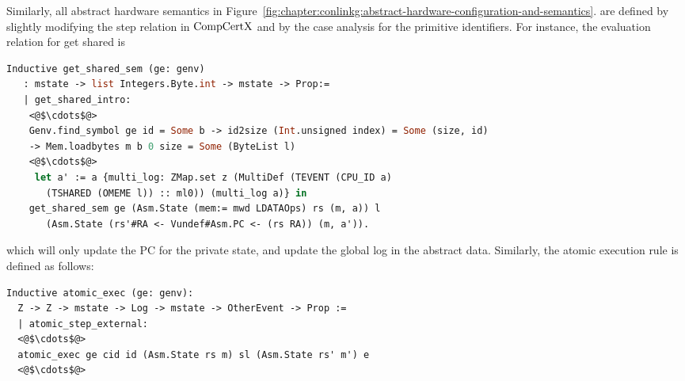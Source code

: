 Similarly, all abstract hardware semantics in  Figure~\ref{fig:chapter:conlinkg:abstract-hardware-configuration-and-semantics}.
are defined 
by slightly modifying the step relation in $\mathrm{CompCertX}$ 
and by the case analysis for the primitive identifiers. 
For instance, the evaluation relation for get shared is
\begin{lstlisting}[language=Caml]
 Inductive get_shared_sem (ge: genv) 
   : mstate -> list Integers.Byte.int -> mstate -> Prop:=
   | get_shared_intro: 
    <@$\cdots$@>
    Genv.find_symbol ge id = Some b -> id2size (Int.unsigned index) = Some (size, id)
    -> Mem.loadbytes m b 0 size = Some (ByteList l)
    <@$\cdots$@>
     let a' := a {multi_log: ZMap.set z (MultiDef (TEVENT (CPU_ID a)
       (TSHARED (OMEME l)) :: ml0)) (multi_log a)} in
    get_shared_sem ge (Asm.State (mem:= mwd LDATAOps) rs (m, a)) l 
       (Asm.State (rs'#RA <- Vundef#Asm.PC <- (rs RA)) (m, a')).
\end{lstlisting}
which will only update the PC for the private state,
and update the global log in the abstract data.
Similarly, the atomic execution rule is defined as follows:
\begin{lstlisting}[language=Caml]
Inductive atomic_exec (ge: genv):
  Z -> Z -> mstate -> Log -> mstate -> OtherEvent -> Prop :=
  | atomic_step_external:
  <@$\cdots$@>
  atomic_exec ge cid id (Asm.State rs m) sl (Asm.State rs' m') e
  <@$\cdots$@>
\end{lstlisting}

